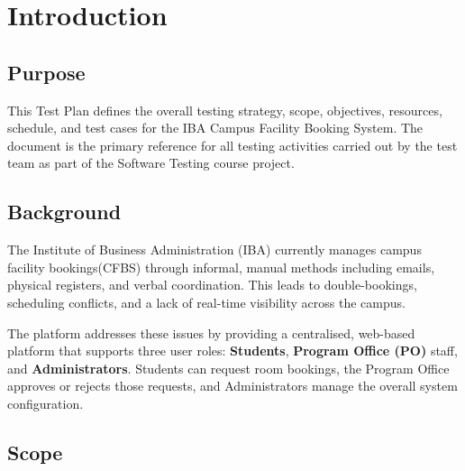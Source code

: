 \documentclass[12pt, a4paper]{article}
\begin{document}


\tableofcontents

\newpage
\section{Introduction}

\subsection{Purpose}

This Test Plan defines the overall testing strategy, scope, objectives, resources, schedule, and test cases for the IBA Campus Facility Booking System. The document is the primary reference for all testing activities carried out by the test team as part of the Software Testing course project.

\subsection{Background}

The Institute of Business Administration (IBA) currently manages campus facility bookings(CFBS) through informal, manual methods including emails, physical registers, and verbal coordination. This leads to double-bookings, scheduling conflicts, and a lack of real-time visibility across the campus.

The platform addresses these issues by providing a centralised, web-based platform that supports three user roles: \textbf{Students}, \textbf{Program Office (PO)} staff, and \textbf{Administrators}. Students can request room bookings, the Program Office approves or rejects those requests, and Administrators manage the overall system configuration.

\subsection{Scope}
\end{document}
